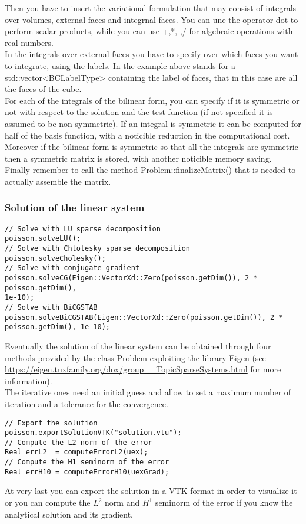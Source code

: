 \documentclass[12pt, a4paper]{article}
\newcommand{\code}[1]{{\footnotesize\ttfamily #1}}
\theoremstyle{definition}
\begin{document}
Then you have to insert the variational formulation that may consist of
integrals over volumes, external faces and integrnal faces. You can une
the operator dot to perform scalar products, while you can use \code{+,*,-,/}
for algebraic operations with real numbers.\\
In the integrals over external faces you have to specify over which faces
you want to integrate, using the labels. In the example above 
\code{{1,2,3,4,5,6}} stands for a \code{std::vector<BCLabelType>} containing 
the label of faces,	that in this case are all the faces of the cube.\\
For each of the integrals of the bilinear form, you can specify if it is
symmetric or not with respect to the solution and the test function (if
not specified it is assumed to be non-symmetric). If an integral is symmetric
it can be computed for half of the basis function, with a noticible reduction
in the computational cost. Moreover if the bilinear form is symmetric so that
all the integrals are symmetric then a symmetric matrix is stored, with another
noticible memory saving.\\
Finally remember to call the method \code{Problem::finalizeMatrix()} that is 
needed to actually assemble the matrix.\\

\subsubsection{Solution of the linear system}
\begin{lstlisting}
// Solve with LU sparse decomposition
poisson.solveLU();
// Solve with Chlolesky sparse decomposition
poisson.solveCholesky();
// Solve with conjugate gradient
poisson.solveCG(Eigen::VectorXd::Zero(poisson.getDim()), 2 * poisson.getDim(), 
1e-10);
// Solve with BiCGSTAB
poisson.solveBiCGSTAB(Eigen::VectorXd::Zero(poisson.getDim()), 2 * 
poisson.getDim(), 1e-10);
\end{lstlisting}

Eventually the solution of the linear system can be obtained through four
methods provided by the class Problem exploiting the library Eigen
(see \url{https://eigen.tuxfamily.org/dox/group__TopicSparseSystems.html} for 
more information).\\
The iterative ones need an initial guess and allow to set a maximum number
of iteration and a tolerance for the convergence.

\begin{lstlisting}
// Export the solution
poisson.exportSolutionVTK("solution.vtu");
// Compute the L2 norm of the error
Real errL2  = computeErrorL2(uex);
// Compute the H1 seminorm of the error
Real errH10 = computeErrorH10(uexGrad);
\end{lstlisting}

At very last you can export the solution in a VTK format in order to visualize 
it or you can compute the $L^2$ norm and $H^1$ seminorm of the error if you 
know the 
analytical solution and its gradient.
\end{document}
